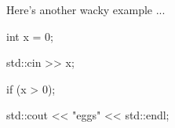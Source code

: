 Here's another wacky example ...

\begin{console}

int x = 0;

std::cin >> x;

if (x > 0);

std::cout << "eggs" << std::endl;

\end{console}


